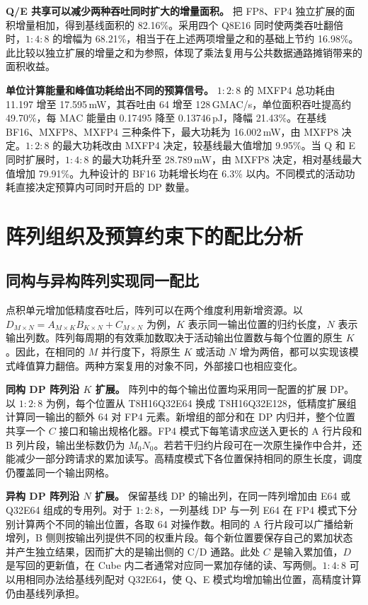 \documentclass[10.5pt,compsoc,UTF8]{CjC}
\newcommand{\ratio}[3]{\ensuremath{#1\!:\!#2\!:\!#3}}
\begin{document}
\textbf{Q/E 共享可以减少两种吞吐同时扩大的增量面积。}
把 FP8、FP4 独立扩展的面积增量相加，得到基线面积的 82.16\%。采用四个 Q8E16 同时使两类吞吐翻倍时，\ratio{1}{4}{8} 的增幅为 68.21\%，相当于在上述两项增量之和的基础上节约 16.98\%。此比较以独立扩展的增量之和为参照，体现了乘法复用与公共数据通路摊销带来的面积收益。

\textbf{单位计算能量和峰值功耗给出不同的预算信号。}
\ratio{1}{2}{8} 的 MXFP4 总功耗由 11.197 增至 17.595\,mW，其吞吐由 64 增至 128\,GMAC/s，单位面积吞吐提高约 49.70\%，每 MAC 能量由 0.17495 降至 0.13746\,pJ，降幅 21.43\%。在基线 BF16、MXFP8、MXFP4 三种条件下，最大功耗为 16.002\,mW，由 MXFP8 决定。\ratio{1}{2}{8} 的最大功耗改由 MXFP4 决定，较基线最大值增加 9.95\%。当 Q 和 E 同时扩展时，\ratio{1}{4}{8} 的最大功耗升至 28.789\,mW，由 MXFP8 决定，相对基线最大值增加 79.91\%。九种设计的 BF16 功耗增长均在 6.3\% 以内。不同模式的活动功耗直接决定预算内可同时开启的 DP 数量。

\section{阵列组织及预算约束下的配比分析}
\label{sec:dse}

\subsection{同构与异构阵列实现同一配比}
\label{sec:array-choices}

点积单元增加低精度吞吐后，阵列可以在两个维度利用新增资源。以 $D_{M\times N}=A_{M\times K}B_{K\times N}+C_{M\times N}$ 为例，$K$ 表示同一输出位置的归约长度，$N$ 表示输出列数。阵列每周期的有效乘加数取决于活动输出位置数与每个位置的原生 $K$。因此，在相同的 $M$ 并行度下，将原生 $K$ 或活动 $N$ 增为两倍，都可以实现该模式峰值算力翻倍。两种方案复用的对象不同，外部接口也相应变化。

\textbf{同构 DP 阵列沿 $K$ 扩展。}
阵列中的每个输出位置均采用同一配置的扩展 DP。以 \ratio{1}{2}{8} 为例，每个位置从 T8H16Q32E64 换成 T8H16Q32E128，低精度扩展组计算同一输出的额外 64 对 FP4 元素。新增组的部分和在 DP 内归并，整个位置共享一个 $C$ 接口和输出规格化器。FP4 模式下每笔请求应送入更长的 A 行片段和 B 列片段，输出坐标数仍为 $M_0N_0$。若若干归约片段可在一次原生操作中合并，还能减少一部分跨请求的累加读写。高精度模式下各位置保持相同的原生长度，调度仍覆盖同一个输出网格。

\textbf{异构 DP 阵列沿 $N$ 扩展。}
保留基线 DP 的输出列，在同一阵列增加由 E64 或 Q32E64 组成的专用列。对于 \ratio{1}{2}{8}，一列基线 DP 与一列 E64 在 FP4 模式下分别计算两个不同的输出位置，各取 64 对操作数。相同的 A 行片段可以广播给新增列，B 侧则按输出列提供不同的权重片段。每个新位置要保存自己的累加状态并产生独立结果，因而扩大的是输出侧的 C/D 通路。此处 $C$ 是输入累加值，$D$ 是写回的更新值，在 Cube 内二者通常对应同一累加存储的读、写两侧。\ratio{1}{4}{8} 可以用相同办法给基线列配对 Q32E64，使 Q、E 模式均增加输出位置，高精度计算仍由基线列承担。
\end{document}
